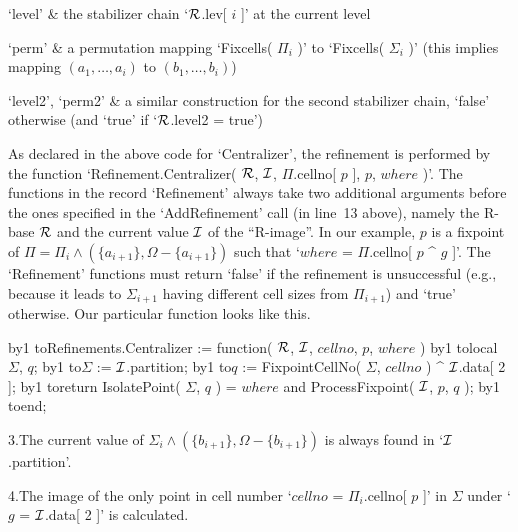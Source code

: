`level' &
    the stabilizer chain `${\cal R}$.lev[ $i$ ]' at the current level

`perm' &
    a permutation mapping `Fixcells(  $\Pi_i$ )' to `Fixcells( $\Sigma_i$
    )' (this implies mapping $(a_1,\ldots,a_i)$ to $(b_1,\ldots,b_i)$)

`level2', `perm2' &
    a  similar construction for    the second stabilizer chain,   `false'
    otherwise (and `true' if `${\cal R}$.level2 = true')
\enditems

As declared in    the above code  for  `Centralizer',  the refinement  is
performed   by   the function     `Refinement.Centralizer(   ${\cal R}$,  ${\cal I}$,
$\Pi$.cellno[  $p$  ],  $p$,  $where$ )'.   The  functions in the  record
`Refinement' always   take two  additional   arguments  before  the  ones
specified  in  the `AddRefinement'  call (in  line~13 above),  namely the
R-base  ${\cal R}$ and  the  current  value  ${\cal I}$  of the ``R-image''.   In our
example,  $p$   is a   fixpoint  of   $\Pi= \Pi_i   \wedge  (\{a_{i+1}\},
\Omega-\{a_{i+1}\})$ such that `$where$ = $\Pi$.cellno[ $p$ ^ $g$ ]'. The
`Refinement'   functions   must  return `false'    if   the refinement is
unsuccessful (e.g., because it  leads to $\Sigma_{i+1}$ having  different
cell   sizes from  $\Pi_{i+1}$)  and  `true'  otherwise.   Our particular
function looks like this.

{\newcount\lineno%
 \def\){\advance\lineno by1 \begingroup\obeylines\cloparen%
        \hbox to\manindent{\hfil $\scriptstyle\the\lineno$\enspace}}%

\)Refinements.Centralizer := function( ${\cal R}$, ${\cal I}$, $cellno$, $p$, $where$ )
\)local \ $\Sigma$,  $q$;
\)\quad $\Sigma$ := ${\cal I}$.partition;
\)\quad $q$ := FixpointCellNo( $\Sigma$, $cellno$ ) ^ ${\cal I}$.data[ 2 ];
\)\quad return IsolatePoint( $\Sigma$, $q$ ) = $where$ %
           and ProcessFixpoint( ${\cal I}$, $p$, $q$ );
\)end;
  \vadjust{\allowbreak}%

}%
3.\enspace    The  current    value   of   $\Sigma_i\wedge  (\{b_{i+1}\},
\Omega-\{b_{i+1}\})$ is always found in `${\cal I}$.partition'.

4.\enspace  The image of  the  only  point  in  cell number  `$cellno$  =
$\Pi_i$.cellno[ $p$  ]' in $\Sigma$  under `$g$ = ${\cal I}$.data[ 2 ]' is
calculated.

